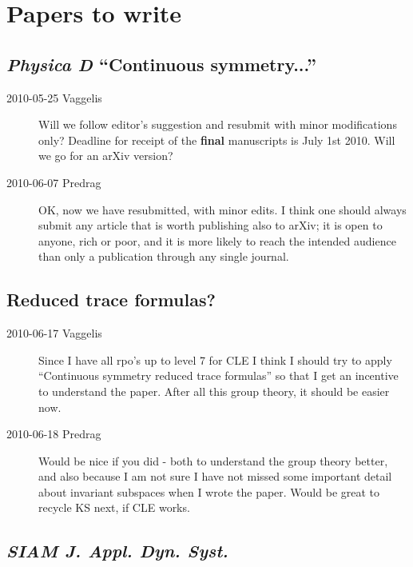 \section{Papers to write}

\subsection{\emph{Physica D} ``Continuous symmetry...''}

\begin{description}

\item[2010-05-25 Vaggelis]
Will we follow editor's suggestion and resubmit with minor modifications only?
Deadline for receipt of the {\bf final} manuscripts is July 1st 2010.
Will we go for an arXiv version?

\item[2010-06-07 Predrag]
OK, now we have resubmitted, with minor edits. I think one should always submit
any article that is worth publishing also to arXiv;
it is open to anyone, rich or poor, and it is
more likely to reach the intended audience than only a publication through
any single journal.

\end{description}

\subsection{Reduced trace formulas?}

\begin{description}
 \item[2010-06-17 Vaggelis]
Since I have all rpo's up to level 7 for CLE I think I should try
to apply ``Continuous symmetry reduced trace formulas'' so that I get an incentive
to understand the paper. After all this group theory, it should be easier now.
 \item[2010-06-18 Predrag]
Would be nice if you did - both to understand the group theory better, and
also because I am not sure I have not missed some important detail about
invariant subspaces when I wrote the paper. Would be great to recycle KS
next, if CLE works.
\end{description}


\subsection{\emph{SIAM J. Appl. Dyn. Syst.}}

